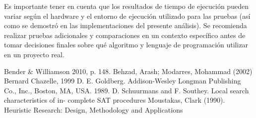\documentclass{article}
\begin{document}
Es importante tener en cuenta que los resultados de tiempo de ejecución pueden variar según el hardware y el entorno de ejecución utilizado para las pruebas (así como se demostró en las implementaciones del presente análisis). Se recomienda realizar pruebas adicionales y comparaciones en un contexto específico antes de tomar decisiones finales sobre qué algoritmo y lenguaje de programación utilizar en un proyecto real.

\clearpage
\begin{thebibliography}{widest entry} 
  \bibitem[1]{} Bender \& Williamson 2010, p. 148.
  \bibitem[2]{} Behzad, Arash; Modarres, Mohammad (2002)
  \bibitem[3]{} Bernard Chazelle, 1999
  \bibitem[4]{}  D. E. Goldberg. Addison-Wesley Longman Publishing Co., Inc., Boston, MA, USA. 1989. 
  \bibitem[5]{} D. Schuurmans and F. Southey. Local search characteristics of in- complete SAT procedures
  \bibitem[6]{} Moustakas, Clark (1990). Heuristic Research: Design, Methodology and Applications
 \end{thebibliography}
\end{document}
